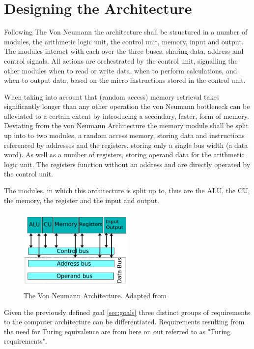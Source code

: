 \chapter{Designing the Architecture} \label{chap:arch}
Following The Von Neumann the architecture shall be structured in a number of modules, the arithmetic logic unit, the control unit, memory, input and output. The modules interact with each over the three buses, sharing data, address and control signals. All actions are orchestrated by the control unit, signalling the other modules when to read or write data, when to perform calculations, and when to output data, based on the micro instructions stored in the control unit.

When taking into account that (random access) memory retrieval takes significantly longer than any other operation the von Neumann bottleneck can be alleviated to a certain extent by introducing a secondary, faster, form of memory. Deviating from the von Neumann Architecture the memory module shall be split up into to two modules, a random access memory, storing data and instructions referenced by addresses and the registers, storing only a single bus width (a data word). As well as a number of registers, storing operand data for the arithmetic logic unit. The registers function without an address and are directly operated by the control unit.

The modules, in which this architecture is split up to, thus are the ALU, the CU, the memory, the register
and the input and output.
\begin{figure}[H]
  \begin{center}
    \includegraphics[width=0.5\textwidth]{figures/VNA-Adapted}
  \end{center}
  \caption{The Von Neumann Architecture. Adapted from \cite{fig-vna}}\label{fig:vna-adapted}
\end{figure}


Given the previously defined goal \ref{sec:goals} three distinct groups of requirements to the computer architecture can be differentiated. Requirements resulting from the need for Turing equivalence are from here on out referred to as "Turing requirements".

